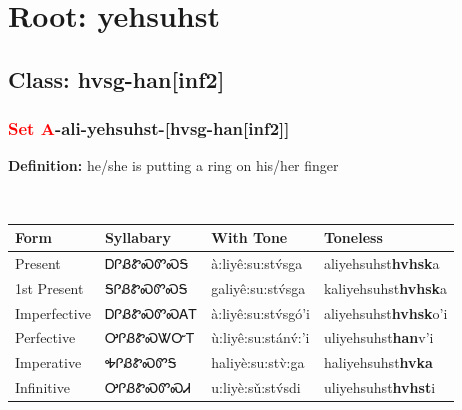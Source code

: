 \needspace{4in}
\section*{Root: yehsuhst}
\nopagebreak
{}
\needspace{3in}
\subsection*{Class: hvsg-han[inf2]}
\nopagebreak
\needspace{2in}
\subsubsection*{\textcolor{Red}{Set A}{-}ali{-}\textbf{yehsuhst}{-}[hvsg-han[inf2]]}
\nopagebreak
\textbf{Definition: } he/she is putting a ring on his/her finger
\\[0.5em]
\begin{tabularx}{\textwidth}{l X X X}%
\toprule%
\textbf{Form}&\textbf{Syllabary}&\textbf{With Tone}&\textbf{Toneless}\\%
\midrule%
Present&ᎠᎵᏰᏑᏍᏛᏍᎦ&à:liyê:su:stv́sga&aliyehsuhst\textbf{hvhsk}a\\%
1st Present&ᎦᎵᏰᏑᏍᏛᏍᎦ&galiyê:su:stv́sga&kaliyehsuhst\textbf{hvhsk}a\\%
Imperfective&ᎠᎵᏰᏑᏍᏛᏍᎪᎢ&à:liyê:su:stv́sgó’i&aliyehsuhst\textbf{hvhsk}o'i\\%
Perfective&ᎤᎵᏰᏑᏍᏔᏅᎢ&ù:liyê:su:stánv́:’i&uliyehsuhst\textbf{han}v'i\\%
Imperative&ᎭᎵᏰᏑᏍᏛᎦ&haliyè:su:stv̀:ga&haliyehsuhst\textbf{hvka}\\%
Infinitive&ᎤᎵᏰᏑᏍᏛᏍᏗ&u:liyè:sǔ:stv́sdi&uliyehsuhst\textbf{hvhst}i\\%
\bottomrule%
\end{tabularx}
\\[1em]